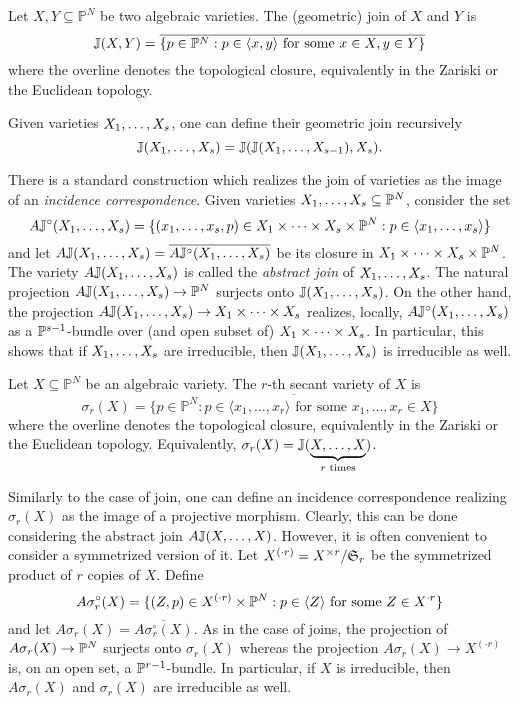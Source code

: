 \begin{definition}
\label{secantVarieties-definition-join}
Let $X,Y \subseteq \mathbb{P}^N$ be two algebraic varieties. The (geometric) join of $X$ and $Y$ is 
\[
\mathbb{J}(X,Y) =  \overline{ \{ p \in \mathbb{P}^N : p \in \langle x , y \rangle \text{ for some $x \in X, y \in Y$}\}}
\]
where the overline denotes the topological closure, equivalently in the Zariski or the Euclidean topology.

Given varieties $X_1 , \ldots , X_s$, one can define their geometric join recursively
\[
\mathbb{J}( X_1 , \ldots , X_s) = \mathbb{J}( \mathbb{J}(X_1 , \ldots , X_{s-1}), X_s).
\]
\end{definition}
There is a standard construction which realizes the join of varieties as the image of an \emph{incidence correspondence}. Given varieties $X_1 , \ldots , X_s \subseteq \mathbb{P}^N$, consider the set
\[
A\mathbb{J}^\circ(X_1 , \ldots , X_s) = \{ (x_1 , \ldots , x_s, p) \in X_1 \times \cdots \times X_s \times \mathbb{P}^N : p \in \langle x_1 , \ldots , x_s\rangle\}
\]
and let $A\mathbb{J}(X_1 , \ldots , X_s) = \overline{A\mathbb{J}^\circ(X_1 , \ldots , X_s)}$ be its closure in $X_1 \times \cdots \times X_s \times \mathbb{P}^N$. The variety $A\mathbb{J}(X_1 , \ldots , X_s)$ is called the \emph{abstract join} of $X_1 , \ldots , X_s$. The natural projection $A\mathbb{J}(X_1 , \ldots , X_s)  \to \mathbb{P}^N$ surjects onto $\mathbb{J}(X_1 , \ldots , X_s)$. On the other hand, the projection $A\mathbb{J}(X_1 , \ldots , X_s) \to X_1 \times \cdots \times X_s$ realizes, locally, $A\mathbb{J}^\circ(X_1 , \ldots , X_s)$ as a $\mathbb{P}^{s-1}$-bundle over (and open subset of) $X_1 \times \cdots \times X_s$. In particular, this shows that if $X_1 , \ldots , X_s$ are irreducible, then $\mathbb{J}(X_1 , \ldots , X_s)$ is irreducible as well.


\begin{definition}
\label{secantVarieties-definition-secantvariety}
Let $X \subseteq \mathbb{P}^N$ be an algebraic variety. The $r$-th secant variety of $X$ is 
\[
\sigma_r(X) = \overline{\{ p \in \mathbb{P}^N : p \in \langle x_1 , \ldots ,  x_r \rangle \text{ for some $x_1 , \ldots , x_r \in X$}
\}}
\]
where the overline denotes the topological closure, equivalently in the Zariski or the Euclidean topology. Equivalently, $\sigma_r(X) = \mathbb{J}(\underbrace{X , \ldots , X}_{r \text{ times}})$.
\end{definition}

Similarly to the case of join, one can define an incidence correspondence realizing $\sigma_r(X)$ as the image of a projective morphism. Clearly, this can be done considering the abstract join $A\mathbb{J}( X , \ldots , X)$. However, it is often convenient to consider a symmetrized version of it. Let $X^{(\cdot r)} = X^{\times r} /\mathfrak{S}_r$ be the symmetrized product of $r$ copies of $X$. Define 
\[
A\sigma^\circ_r(X) = \{ (Z , p  ) \in X^{(\cdot r)} \times \mathbb{P}^N : p \in \langle Z \rangle \text{ for some } Z \in X^{\cdot r}\}
\]
and let $A\sigma_r(X) = \overline{ A \sigma^\circ_r(X)}$. As in the case of joins, the projection of $A\sigma_r(X) \to \mathbb{P}^N$ surjects onto $\sigma_r(X)$ whereas the projection $A\sigma_r(X) \to X^{(\cdot r)}$ is, on an open set, a $\mathbb{P}^{r-1}$-bundle. In particular, if $X$ is irreducible, then $A\sigma_r(X)$ and $\sigma_r(X)$ are irreducible as well.


